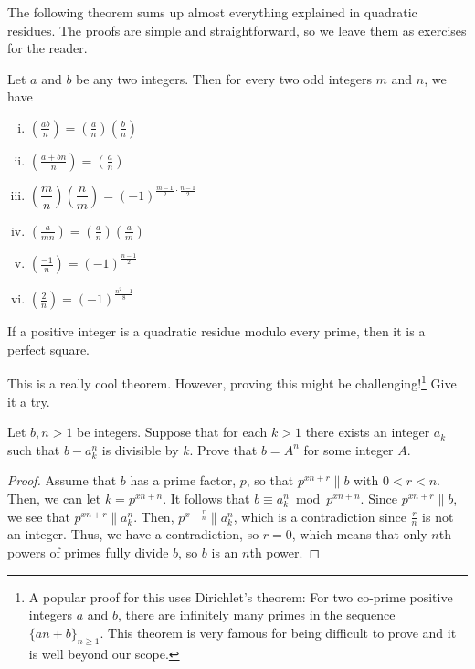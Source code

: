 \documentclass[main.tex]{subfile}
\begin{document}
	The following theorem sums up almost everything explained in quadratic residues. The proofs are simple and straightforward, so we leave them as exercises for the reader.
		\begin{theorem}
			Let $a$ and $b$ be any two integers. Then for every two odd integers $m$ and $n$, we have
			\begin{enumerate}[i.]
				\item $\displaystyle \left(\frac{ab}{n}\right) = \left(\frac{a}{n}\right) \left(\frac{b}{n}\right)$
				\item $\displaystyle \left(\frac{a+bn}{n}\right) = \left(\frac{a}{n}\right)$
				\item $\displaystyle \left(\dfrac{m}{n}\right)\left(\dfrac{n}{m}\right)=(-1)^{\frac{m-1}{2}\cdot \frac{n-1}{2}}$
				\item $\displaystyle \left(\frac{a}{mn}\right) = \left(\frac{a}{n}\right) \left(\frac{a}{m}\right)$
				\item $\displaystyle \left(\frac{-1}{n}\right) = (-1)^{\frac{n-1}{2}}$
				\item $\displaystyle \left(\frac{2}{n}\right) = (-1)^{\frac{n^2-1}{8}}$
			\end{enumerate}
		\end{theorem}

		\begin{theorem}
			If a positive integer is a quadratic residue modulo every prime, then it is a perfect square.
		\end{theorem}
	This is a really cool theorem. However, proving this might be challenging!\footnote{A popular proof for this uses Dirichlet's theorem: For two co-prime positive integers $a$ and $b$, there are infinitely many primes in the sequence $\{an+b\}_{n\geq1}$. This theorem is very famous for being difficult to prove and it is well beyond our scope.} Give it a try.
		\begin{theorem}
			Let $b,n > 1$ be integers. Suppose that for each $k > 1$ there exists an integer $a_k$ such that $b - a^n_k$ is divisible by $k$. Prove that $b = A^n$ for some integer $A$.
		\end{theorem}

		\begin{proof}
			Assume that $ b$ has a prime factor, $ p$, so that $ p^{xn + r}\|b$ with $ 0 < r < n$. Then, we can let $ k = p^{xn + n}$. It follows that $ b\equiv a_k^n\bmod p^{xn + n}$. Since $ p^{xn + r}\|b$, we see that $ p^{xn + r}\|a_k^n$. Then, $ p^{x + \frac {r}{n}}\|a_k^n$, which is a contradiction since $ \frac {r}{n}$ is not an integer. Thus, we have a contradiction, so $ r = 0$, which means that only $ n$th powers of primes fully divide $ b$, so $ b$ is an $ n$th power.
		\end{proof}
\end{document}
